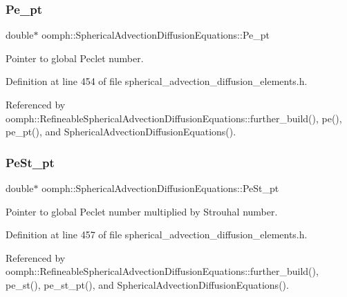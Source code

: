 \subsubsection{\texorpdfstring{Pe\+\_\+pt}{Pe\_pt}}
{\footnotesize\ttfamily double$\ast$ oomph\+::\+Spherical\+Advection\+Diffusion\+Equations\+::\+Pe\+\_\+pt\hspace{0.3cm}{\ttfamily [protected]}}



Pointer to global Peclet number. 



Definition at line 454 of file spherical\+\_\+advection\+\_\+diffusion\+\_\+elements.\+h.



Referenced by oomph\+::\+Refineable\+Spherical\+Advection\+Diffusion\+Equations\+::further\+\_\+build(), pe(), pe\+\_\+pt(), and Spherical\+Advection\+Diffusion\+Equations().

\mbox{\label{classoomph_1_1SphericalAdvectionDiffusionEquations_a3fdb5e8765ae60ea6c218629e2cb207c}} 
\subsubsection{\texorpdfstring{Pe\+St\+\_\+pt}{PeSt\_pt}}
{\footnotesize\ttfamily double$\ast$ oomph\+::\+Spherical\+Advection\+Diffusion\+Equations\+::\+Pe\+St\+\_\+pt\hspace{0.3cm}{\ttfamily [protected]}}



Pointer to global Peclet number multiplied by Strouhal number. 



Definition at line 457 of file spherical\+\_\+advection\+\_\+diffusion\+\_\+elements.\+h.



Referenced by oomph\+::\+Refineable\+Spherical\+Advection\+Diffusion\+Equations\+::further\+\_\+build(), pe\+\_\+st(), pe\+\_\+st\+\_\+pt(), and Spherical\+Advection\+Diffusion\+Equations().

\mbox{\label{classoomph_1_1SphericalAdvectionDiffusionEquations_a588bb8fcf23cd8bc38225f974d4cde7e}} 
